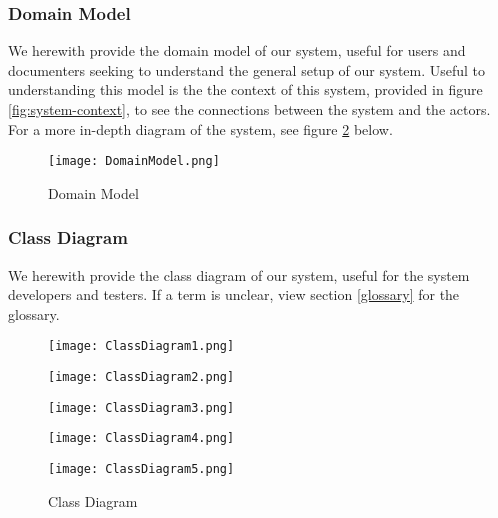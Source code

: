 \documentclass[11pt]{article}
\newcounter{use case ID}
\begin{document}
\subsubsection{Domain Model}

We herewith provide the domain model of our system, useful for users and documenters seeking to understand the general setup of our system. Useful to understanding this model is the the context of this system, provided in figure \ref{fig:system-context}, to see the connections between the system and the actors. For a more in-depth diagram of the system, see figure \ref{fig:class-diagram} below.

\begin{figure}[H]
\texttt{[image: DomainModel.png]}
\centering
\caption{Domain Model}
\label{fig:domain-model}
\end{figure}

\clearpage

\subsubsection{Class Diagram}

We herewith provide the class diagram of our system, useful for the system developers and testers. If a term is unclear, view section \ref{glossary} for the glossary.

\begin{figure}[H]
\texttt{[image: ClassDiagram1.png]}
\end{figure}

\begin{figure}[H]
\texttt{[image: ClassDiagram2.png]}
\end{figure}

\begin{figure}[H]
\texttt{[image: ClassDiagram3.png]}
\end{figure}

\begin{figure}[H]
\texttt{[image: ClassDiagram4.png]}
\end{figure}

\begin{figure}[H]
\texttt{[image: ClassDiagram5.png]}
\caption{Class Diagram}
\label{fig:class-diagram}
\end{figure}

\clearpage
\end{document}
